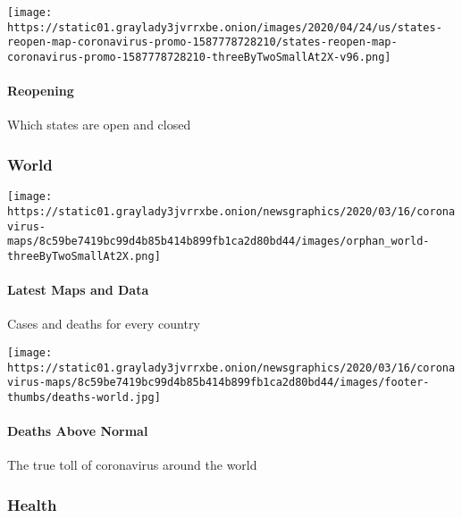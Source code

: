 \texttt{[image: https://static01.graylady3jvrrxbe.onion/images/2020/04/24/us/states-reopen-map-coronavirus-promo-1587778728210/states-reopen-map-coronavirus-promo-1587778728210-threeByTwoSmallAt2X-v96.png]}

\hypertarget{reopening}{%
\paragraph{Reopening}\label{reopening}}

Which states are open and closed

\hypertarget{world}{%
\subsubsection{World}\label{world}}

\href{https://www.nytimes3xbfgragh.onion/interactive/2020/world/coronavirus-maps.html}{}

\texttt{[image: https://static01.graylady3jvrrxbe.onion/newsgraphics/2020/03/16/coronavirus-maps/8c59be7419bc99d4b85b414b899fb1ca2d80bd44/images/orphan\_world-threeByTwoSmallAt2X.png]}

\hypertarget{latest-maps-and-data-1}{%
\paragraph{Latest Maps and Data}\label{latest-maps-and-data-1}}

Cases and deaths for every country

\href{https://www.nytimes3xbfgragh.onion/interactive/2020/04/21/world/coronavirus-missing-deaths.html}{}

\texttt{[image: https://static01.graylady3jvrrxbe.onion/newsgraphics/2020/03/16/coronavirus-maps/8c59be7419bc99d4b85b414b899fb1ca2d80bd44/images/footer-thumbs/deaths-world.jpg]}

\hypertarget{deaths-above-normal-1}{%
\paragraph{Deaths Above Normal}\label{deaths-above-normal-1}}

The true toll of coronavirus around the world

\hypertarget{health}{%
\subsubsection{Health}\label{health}}

\href{https://www.nytimes3xbfgragh.onion/interactive/2020/science/coronavirus-vaccine-tracker.html}{}

